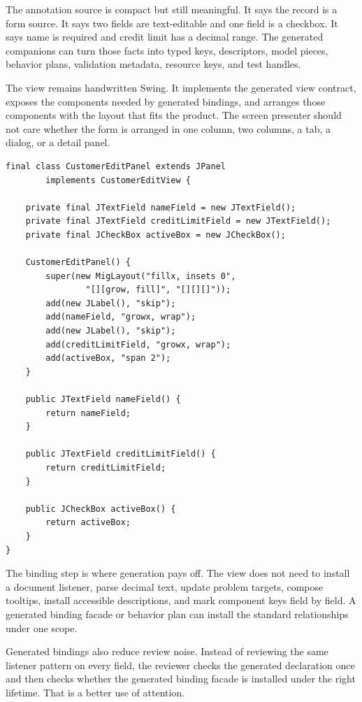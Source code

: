 The annotation source is compact but still meaningful. It says the record is a form source. It says two fields are text-editable and one field is a checkbox. It says name is required and credit limit has a decimal range. The generated companions can turn those facts into typed keys, descriptors, model pieces, behavior plans, validation metadata, resource keys, and test handles.

The view remains handwritten Swing. It implements the generated view contract, exposes the components needed by generated bindings, and arranges those components with the layout that fits the product. The screen presenter should not care whether the form is arranged in one column, two columns, a tab, a dialog, or a detail panel.

\begin{lstlisting}[caption={A view implements the generated contract with ordinary Swing.}]
final class CustomerEditPanel extends JPanel
        implements CustomerEditView {

    private final JTextField nameField = new JTextField();
    private final JTextField creditLimitField = new JTextField();
    private final JCheckBox activeBox = new JCheckBox();

    CustomerEditPanel() {
        super(new MigLayout("fillx, insets 0",
                "[][grow, fill]", "[][][]"));
        add(new JLabel(), "skip");
        add(nameField, "growx, wrap");
        add(new JLabel(), "skip");
        add(creditLimitField, "growx, wrap");
        add(activeBox, "span 2");
    }

    public JTextField nameField() {
        return nameField;
    }

    public JTextField creditLimitField() {
        return creditLimitField;
    }

    public JCheckBox activeBox() {
        return activeBox;
    }
}
\end{lstlisting}

The binding step is where generation pays off. The view does not need to install a document listener, parse decimal text, update problem targets, compose tooltips, install accessible descriptions, and mark component keys field by field. A generated binding facade or behavior plan can install the standard relationships under one scope.

Generated bindings also reduce review noise. Instead of reviewing the same listener pattern on every field, the reviewer checks the generated declaration once and then checks whether the generated binding facade is installed under the right lifetime. That is a better use of attention.

